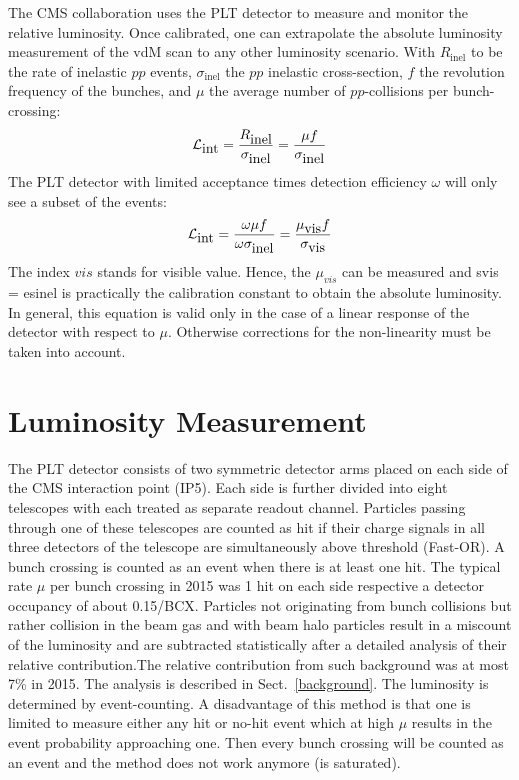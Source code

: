 The CMS collaboration uses the PLT detector to measure and monitor the relative luminosity.
Once calibrated, one can extrapolate the absolute luminosity measurement of the
vdM scan to any other luminosity scenario. With $R_{\mbox{inel}}$ to be the rate of inelastic
$pp$ events, $\sigma_{\mbox{inel}}$ the $pp$ inelastic cross-section, $f$ the revolution frequency
of the bunches, and $\mu$ the average number of $pp$-collisions per bunch-crossing:
\begin{equation}
{\cal L}_{\mbox{int}} = \frac{R_{\mbox{inel}}}{\sigma_{\mbox{inel}}} = \frac{\mu f}{\sigma_{\mbox{inel}}}
\end{equation}
The PLT detector with limited acceptance times detection efficiency $\omega$ will only see a subset of the
events:
\begin{equation}
{\cal L}_{\mbox{int}} = \frac{\omega \mu f}{\omega \sigma_{\mbox{inel}}} = \frac{\mu_{\mbox{vis}} f}{\sigma_{\mbox{vis}}}
\end{equation}
The index $vis$ stands for visible value. Hence, the $\mu_{vis}$ can be measured and
svis = esinel is practically the calibration constant to obtain the absolute luminosity.
In general, this equation is valid only in the case of a linear response of the detector with
respect to $\mu$. Otherwise corrections for the non-linearity must be taken into account.


\section {Luminosity Measurement} \label{sec:lumiMeasurement}
The PLT detector consists of two symmetric detector arms placed on each side of the CMS interaction point (IP5).
Each side is further divided into eight telescopes with each treated as separate readout channel. Particles passing
through one of these telescopes are counted as hit if their charge signals in all three detectors of the
telescope are simultaneously above threshold (Fast-OR). A bunch crossing is counted as an event when there is at least
one hit. The typical rate $\mu$ per bunch crossing in 2015 was 1 hit on each side respective
a detector occupancy of about 0.15/BCX. Particles not originating from bunch collisions but rather
collision in the beam gas and with beam halo particles result in a miscount of the luminosity and
are subtracted statistically after a detailed analysis of their relative contribution.The relative
contribution from such background was at most 7\% in 2015. The analysis is described in Sect.~\ref{background}.
The luminosity is determined by event-counting. A disadvantage of this method is that one is
limited to measure either any hit or no-hit event which at high $\mu$ results in the event probability
approaching one. Then every bunch crossing will be counted as an event and the method does
not work anymore (is saturated).

